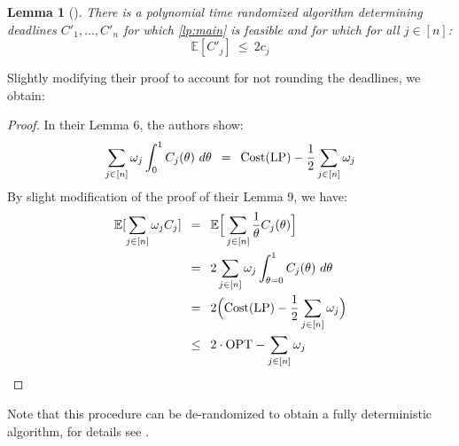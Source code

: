 \documentclass[11pt]{article}
\newcommand{\Hquad}{\hspace{0.5em}}
\newtheorem{lemma}[theorem]{Lemma}
\begin{document}
\begin{lemma}[\cite{im19}]\label{lemma:2approxold}
There is a polynomial time randomized algorithm determining deadlines $C'_1,\dotsc,C'_n$ for which \ref{lp:main} is feasible and for which for all $j \in [n]$:
\begin{equation*}
\mathbb{E}[C'_j] \ \le\  2c_j    
\end{equation*}
\end{lemma}

\noindent Slightly modifying their proof to account for not rounding the deadlines, we obtain:

\rslemmatwoapproxstrong*

\begin{proof}
In their Lemma 6, the authors show:
\begin{equation*}
    \sum_{j \in [n]}\omega_j \int_0^1 C_j(\theta)\  d \theta \Hquad = \Hquad \mathrm{Cost}(\mathrm{LP}) - \frac{1}{2}\sum_{j \in [n]}\omega_j 
\end{equation*}
By slight modification of the proof of their Lemma 9, we have:
\begin{align*}
    \mathbb{E}[\sum_{j \in [n]}\omega_j C_j] \Hquad&=\Hquad \mathbb{E}\Big[\sum_{j \in [n]} \frac{1}{\theta}C_j(\theta)\Big]\\
    ~ &=\Hquad 2 \sum_{j \in [n]} \omega_j \int_{\theta = 0}^1 C_j(\theta)\ d\theta\\
    ~ &=\Hquad 2\Big(\mathrm{Cost}(\mathrm{LP}) - \frac{1}{2}\sum_{j \in [n]}\omega_j\Big)\\
    ~ &\le\Hquad 2 \cdot \mathrm{OPT} - \sum_{j \in [n]}\omega_j \qedhere
\end{align*}

\end{proof}

Note that this procedure can be de-randomized to obtain a fully deterministic algorithm, for details see \cite{im19}.\\
\end{document}
